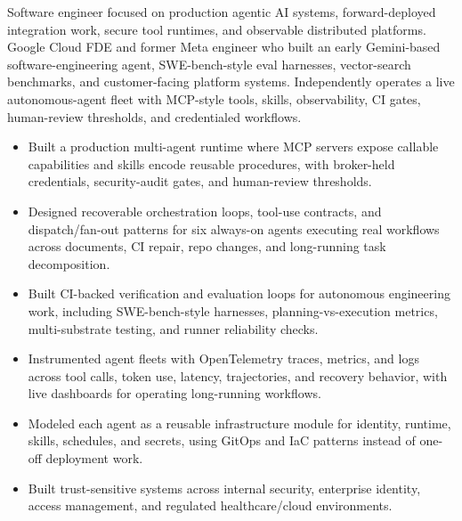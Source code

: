 


Software engineer focused on production agentic AI systems, forward-deployed integration work, secure tool runtimes, and observable distributed platforms. Google Cloud FDE and former Meta engineer who built an early Gemini-based software-engineering agent, SWE-bench-style eval harnesses, vector-search benchmarks, and customer-facing platform systems. Independently operates a live autonomous-agent fleet with MCP-style tools, skills, observability, CI gates, human-review thresholds, and credentialed workflows.
\begin{itemize}
  \item Built a production multi-agent runtime where MCP servers expose callable capabilities and skills encode reusable procedures, with broker-held credentials, security-audit gates, and human-review thresholds.
  \item Designed recoverable orchestration loops, tool-use contracts, and dispatch/fan-out patterns for six always-on agents executing real workflows across documents, CI repair, repo changes, and long-running task decomposition.
  \item Built CI-backed verification and evaluation loops for autonomous engineering work, including SWE-bench-style harnesses, planning-vs-execution metrics, multi-substrate testing, and runner reliability checks.
\end{itemize}
\begin{itemize}
  \item Instrumented agent fleets with OpenTelemetry traces, metrics, and logs across tool calls, token use, latency, trajectories, and recovery behavior, with live dashboards for operating long-running workflows.
  \item Modeled each agent as a reusable infrastructure module for identity, runtime, skills, schedules, and secrets, using GitOps and IaC patterns instead of one-off deployment work.
  \item Built trust-sensitive systems across internal security, enterprise identity, access management, and regulated healthcare/cloud environments.
\end{itemize}




